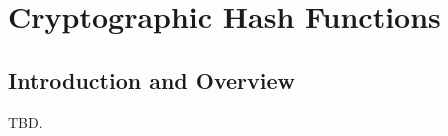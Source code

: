 \chapter{Cryptographic Hash Functions}
\label{ccrh0}

\section{Introduction and Overview}
\label{ccrh0:siov0}

TBD.

